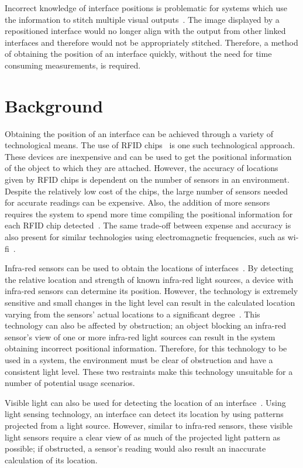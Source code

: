 \documentclass{bmcart}
\begin{document}
Incorrect knowledge of interface positions is problematic for systems which use the information to stitch multiple visual outputs~\cite{Jones2011}.
The image displayed by a repositioned interface would no longer align with the output from other linked interfaces and therefore would not be appropriately stitched. Therefore, a method of obtaining the position of an interface quickly, without the need for time consuming measurements, is required.


\section*{Background}\label{sec:related}

Obtaining the position of an interface can be achieved through a variety of technological means.
The use of RFID chips~\cite{Ma2017} is one such technological approach.
These devices are inexpensive and can be used to get the positional information of the object to which they are attached.
However, the accuracy of locations given by RFID chips is dependent on the number of sensors in an environment.
Despite the relatively low cost of the chips, the large number of sensors needed for accurate readings can be expensive.
Also, the addition of more sensors requires the system to spend more time compiling the positional information for each RFID chip detected~\cite{Ma2017}.
The same trade-off between expense and accuracy is also present for similar technologies using electromagnetic frequencies, such as wi-fi~\cite{Khuong2017}.

Infra-red sensors can be used to obtain the locations of interfaces~\cite{Kortuem2005}.
By detecting the relative location and strength of known infra-red light sources, a device with infra-red sensors can determine its position.
However, the technology is extremely sensitive and small changes in the light level can result in the calculated location varying from the sensors' actual locations to a significant degree~\cite{Kortuem2005}.
This technology can also be affected by obstruction; an object blocking an infra-red sensor's view of one or more infra-red light sources can result in the system obtaining incorrect positional information.
Therefore, for this technology to be used in a system, the environment must be clear of obstruction and have a consistent light level.
These two restraints make this technology unsuitable for a number of potential usage scenarios.

Visible light can also be used for detecting the location of an interface~\cite{Smith2013}.
Using light sensing technology, an interface can detect its location by using patterns projected from a light source.
However, similar to infra-red sensors, these visible light sensors require a clear view of as much of the projected light pattern as possible; if obstructed, a sensor's reading would also result an inaccurate calculation of its location.
\end{document}
